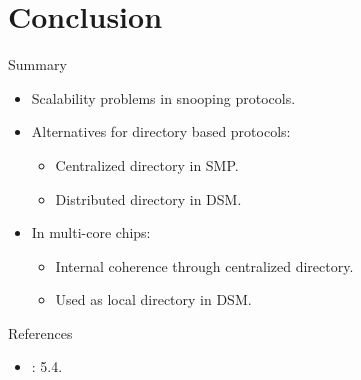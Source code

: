 \section{Conclusion}

\begin{frame}[t]{Summary}
\begin{itemize}
  \item Scalability problems in snooping protocols.
  \item Alternatives for directory based protocols:
    \begin{itemize}
      \item Centralized directory in SMP.
      \item Distributed directory in DSM.
    \end{itemize}
  \item In multi-core chips:
    \begin{itemize}
      \item Internal coherence through centralized directory.
      \item Used as local directory in DSM.
    \end{itemize}
\end{itemize}
\end{frame}


\begin{frame}[t]{References}
\begin{itemize}
  \item \bibhennessy
  : 5.4.

\end{itemize}
\end{frame}
